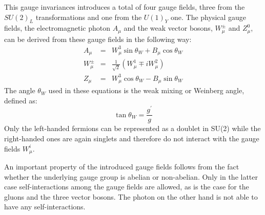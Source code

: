 \begin{myindentpar}
\begin{description}
    This gauge invariances introduces a total of four gauge fields, three from the $SU(2)_L$ transformations and one from the $U(1)_Y$ one.
    The physical gauge fields, the electromagnetic photon $A_{\mu}$ and the weak vector bosons, $W^{\pm}_{\mu}$ and $Z^{0}_{\mu}$, can be derived from these gauge fields in the following way:
    \begin{eqnarray}
     A_{\mu} & = & W_{\mu}^{3} \sin \theta_{W} + B_{\mu} \cos \theta_{W} \nonumber \\
     W_{\mu}^{\pm} & = & \frac{1}{\sqrt{2}} \left( W_{\mu}^{1} \mp i W_{\mu}^{2} \right) \label{eq::EWGaugeBosons} \\
     Z_{\mu} & = & W_{\mu}^{3} \cos \theta_{W} - B_{\mu} \sin \theta_{W} \nonumber
    \end{eqnarray}
    The angle $\theta_{W}$ used in these equations is the weak mixing or Weinberg angle, defined as:
    \begin{equation}
     \tan \theta_{W} = \frac{g^{'}}{g}
    \end{equation}
    Only the left-handed fermions can be represented as a doublet in SU(2) while the right-handed ones are again singlets and therefore do not interact with the gauge fields $W_{\mu}^{i}$. %
   \end{description}
\end{myindentpar}

An important property of the introduced gauge fields follows from the fact whether the underlying gauge group is abelian or non-abelian. Only in the latter case self-interactions among the gauge fields are allowed, as is the case for the gluons and the three vector bosons. The photon on the other hand is not able to have any self-interactions. %

